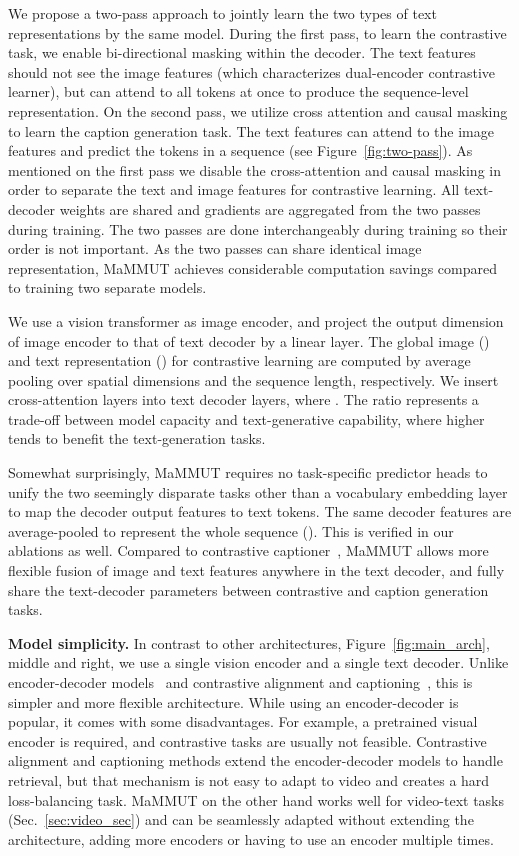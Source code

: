 \documentclass[10pt]{article} \usepackage[accepted]{tmlr}
\newcommand{\ours}{MaMMUT\xspace}
\begin{document}
We propose a two-pass approach to jointly learn the two types of text representations by the same model. During the first pass, to learn the contrastive task, we enable bi-directional masking within the decoder. The text features should not see the image features (which characterizes dual-encoder contrastive learner), but can attend to all tokens at once to produce the sequence-level representation.
On the second pass, we utilize cross attention and causal masking to learn the caption generation task. The text features can attend to the image features and predict the tokens in a sequence (see Figure~\ref{fig:two-pass}). As mentioned on the first pass we disable the cross-attention and causal masking in order to separate the text and image features for contrastive learning. All text-decoder weights are shared and gradients are aggregated from the two passes during training. The two passes are done interchangeably during training so their order is not important. 
As the two passes can share identical image representation, \ours achieves considerable computation savings compared to training two separate models.

We use a vision transformer as image encoder, and project the output dimension of image encoder to that of text decoder by a linear layer. The global image () and text representation () for contrastive learning are computed by average pooling over spatial dimensions and the sequence length, respectively. We insert  cross-attention layers into  text decoder layers, where . The ratio  represents a trade-off between model capacity and text-generative capability, where higher  tends to benefit the text-generation tasks.

Somewhat surprisingly, \ours requires no task-specific predictor heads to unify the two seemingly disparate tasks other than a vocabulary embedding layer to map the decoder output features to text tokens. The same decoder features are average-pooled to represent the whole sequence (). This is verified in our ablations as well.
Compared to contrastive captioner~\citep{yu2022coca}, \ours allows more flexible fusion of image and text features anywhere in the text decoder, and fully share the text-decoder parameters between contrastive and caption generation tasks. 



\textbf{Model simplicity.}
In contrast to other architectures, Figure~\ref{fig:main_arch}, middle and right, we use a single vision encoder and a single text decoder. Unlike encoder-decoder models~\citep{pali,wang2022git,wang2022image} and contrastive alignment and captioning~\citep{albef,yu2022coca}, this is simpler and more flexible architecture. While using an encoder-decoder is popular, it comes with some disadvantages. For example, a pretrained visual encoder is  required, and contrastive tasks are usually not feasible. Contrastive alignment and captioning methods extend the encoder-decoder models to handle retrieval, but that mechanism is not easy to adapt to video and creates a hard loss-balancing task. 
\ours on the other hand works well for video-text tasks (Sec.~\ref{sec:video_sec}) and can be seamlessly adapted without extending the architecture, adding more encoders or having to use an encoder multiple times. 
\end{document}
